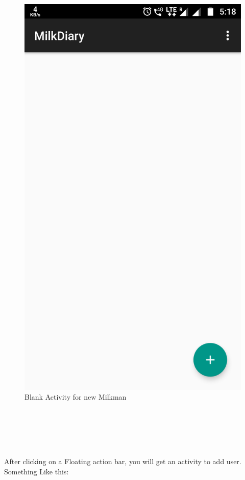 \begin{figure}[h]
	\centering
	\includegraphics[width=0.7\linewidth]{s06}
	\caption{Blank Activity for new Milkman}
\end{figure}
\begin{text}
	\\
	\\
	\\
	\\
\end{text}
After clicking on a Floating action bar, you will get an activity to add user. Something Like this:
